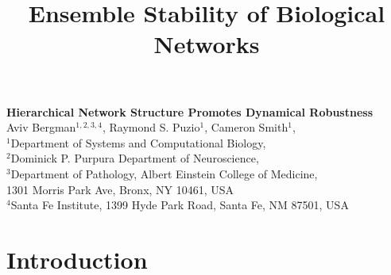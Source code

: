 



\let\ref\autoref

\title{Ensemble Stability of Biological Networks}


\begin{center}
{\Large
\textbf{Hierarchical Network Structure Promotes Dynamical Robustness}
}
\\[.5cm]
Aviv Bergman$^{1,2,3,4}$,
Raymond S. Puzio$^{1}$,
Cameron Smith$^{1}$,
\\[.5cm]
$^1$Department of Systems and Computational Biology,\\
$^2$Dominick P. Purpura Department of Neuroscience,\\
$^3$Department of Pathology, Albert Einstein College of Medicine,\\
1301 Morris Park Ave, Bronx, NY 10461, USA\\
$^4$Santa Fe Institute, 1399 Hyde Park Road, Santa Fe, NM 87501, USA
\\[.5cm]
\end{center}

{\begin{quote} \bf

\end{quote}}

\listoftodos
\tableofcontents

\section{Introduction}


